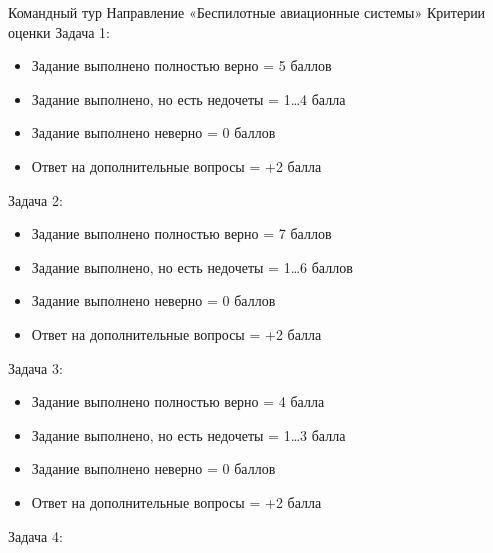 \markSection
Командный тур
Направление «Беспилотные авиационные системы»
Критерии оценки
Задача 1:
\begin{itemize}
    \item	Задание выполнено полностью верно = 5 баллов 
    \item	Задание выполнено, но есть недочеты = 1…4 балла
    \item	Задание выполнено неверно = 0 баллов
    \item	Ответ на дополнительные вопросы = +2 балла
\end{itemize}
Задача 2:
\begin{itemize}
    \item	Задание выполнено полностью верно = 7 баллов 
    \item	Задание выполнено, но есть недочеты = 1…6 баллов
    \item	Задание выполнено неверно = 0 баллов
    \item	Ответ на дополнительные вопросы = +2 балла
\end{itemize}
Задача 3:
\begin{itemize}
    \item	Задание выполнено полностью верно = 4 балла 
    \item	Задание выполнено, но есть недочеты = 1…3 балла
    \item	Задание выполнено неверно = 0 баллов
    \item	Ответ на дополнительные вопросы = +2 балла
\end{itemize}
Задача 4:
